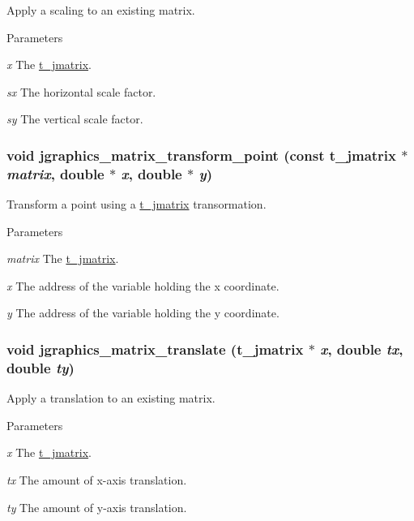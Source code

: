 Apply a scaling to an existing matrix. 
\begin{DoxyParams}{Parameters}
\item[{\em x}]The \hyperlink{structt__jmatrix}{t\_\-jmatrix}. \item[{\em sx}]The horizontal scale factor. \item[{\em sy}]The vertical scale factor. \end{DoxyParams}
\hypertarget{group__jmatrix_gae2fbe033e0d1cae567b9cea4c4c8c91d}{
\subsubsection[{jgraphics\_\-matrix\_\-transform\_\-point}]{\setlength{\rightskip}{0pt plus 5cm}void jgraphics\_\-matrix\_\-transform\_\-point (const {\bf t\_\-jmatrix} $\ast$ {\em matrix}, \/  double $\ast$ {\em x}, \/  double $\ast$ {\em y})}}
\label{group__jmatrix_gae2fbe033e0d1cae567b9cea4c4c8c91d}


Transform a point using a \hyperlink{structt__jmatrix}{t\_\-jmatrix} transormation. 
\begin{DoxyParams}{Parameters}
\item[{\em matrix}]The \hyperlink{structt__jmatrix}{t\_\-jmatrix}. \item[{\em x}]The address of the variable holding the x coordinate. \item[{\em y}]The address of the variable holding the y coordinate. \end{DoxyParams}
\hypertarget{group__jmatrix_gaf39440de92c4e2164d233761af8ba4b9}{
\subsubsection[{jgraphics\_\-matrix\_\-translate}]{\setlength{\rightskip}{0pt plus 5cm}void jgraphics\_\-matrix\_\-translate ({\bf t\_\-jmatrix} $\ast$ {\em x}, \/  double {\em tx}, \/  double {\em ty})}}
\label{group__jmatrix_gaf39440de92c4e2164d233761af8ba4b9}


Apply a translation to an existing matrix. 
\begin{DoxyParams}{Parameters}
\item[{\em x}]The \hyperlink{structt__jmatrix}{t\_\-jmatrix}. \item[{\em tx}]The amount of x-\/axis translation. \item[{\em ty}]The amount of y-\/axis translation. \end{DoxyParams}
